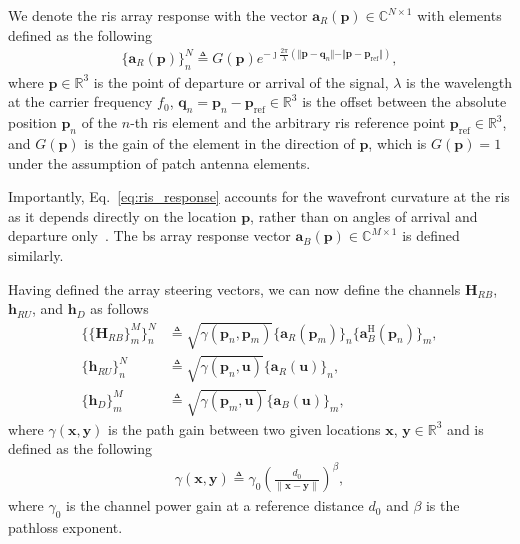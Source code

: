 \documentclass[10pt,journal,compsoc]{IEEEtran}
\newcommand{\ssub}[1]{{\scriptscriptstyle { #1}}}
\newcommand{\mb}[1]{\mathbf{{#1}}}
\newcommand{\herm}{\mathrm{H}}
\begin{document}
We denote the \gls{ris} array response with the vector $\mb{a}_{\ssub{R}}(\mb{p}) \in \mathbb{C}^{N \times 1}$ with elements defined as the following
\begin{align}
    \{\mb{a}_{\ssub{R}}(\mb{p})\}^N_n \triangleq G(\mb{p}) e^{ -\jmath \frac{2 \pi }{\lambda} \left(\Vert \mb{p}-\mb{q}_n\Vert-\Vert \mb{p}-\mb{p}_{\text{ref}}\Vert \right)}, \label{eq:ris_response}
\end{align}
where $\mb{p} \in \mathbb{R}^3$ is the point of departure or arrival of the signal, $\lambda$ is the wavelength at the carrier frequency $f_0$, $\mb{q}_n=\mb{p}_n-\mb{p}_{\text{ref}}  \in \mathbb{R}^3$ is the offset between the absolute position $\mb{p}_n$ of the $n$-th \gls{ris} element and the arbitrary \gls{ris} reference point $\mb{p}_{\text{ref}} \in \mathbb{R}^3$, and $G(\mb{p})$ is the gain of the element 
in the direction of $\mb{p}$, which is 
$G(\mb{p}) = 1$ under the assumption of patch antenna elements. 

Importantly, Eq.~\eqref{eq:ris_response} accounts for the wavefront curvature at the \gls{ris} as it depends directly on the location $\mb{p}$, rather than on angles of arrival and departure only~\cite{abu2021near, rahal2021ris}. The \gls{bs} array response vector $\mb{a}_{\ssub{B}}(\bm{p}) \in \mathbb{C}^{M \times 1}$ is defined similarly.

Having defined the array steering vectors, we can now define the channels $\mb{H}_{\ssub{RB}}$, $\mb{h}_{\ssub{RU}}$, and $\mb{h}_{\ssub{D}}$ as follows
\begin{align}
    \{\{\mb{H}_{\ssub{RB}}\}^{M}_{m}\}^N_n &\triangleq \sqrt{\gamma(\mb{p}_n,\mb{p}_m)}\{\mb{a}_{\ssub{R}}(\mb{p}_m)\}_n\{\mb{a}^{\herm}_{\ssub{B}}(\mb{p}_n)\}_m, \label{eq:channel_bs_ris}\\
    \{\mb{h}_{\ssub{RU}}\}^N_n & \triangleq \sqrt{\gamma(\mb{p}_n,\mb{u})}\{\mb{a}_{\ssub{R}}(\mb{u})\}_n, \label{eq:channel_ris_ue}\\
    \{\mb{h}_{\ssub{D}}\}^M_m & \triangleq \sqrt{\gamma(\mb{p}_m,\mb{u})}\{\mb{a}_{\ssub{B}}(\mb{u})\}_m, \label{eq:channel_bs_ue}  
\end{align}
where $\gamma(\mb{x},\mb{y})$ is the path gain between two given locations $\mb{x}$, $\mb{y} \in \mathbb{R}^3$ and is defined as the following
\begin{align}
\gamma(\mb{x},\mb{y}) \triangleq \gamma_0 \left( \tfrac{d_0}{\|\mb{x} - \mb{y}\|} \right)^\beta,
\label{eq:path_gain}
\end{align}
where $\gamma_0$ is the channel power gain at a reference distance $d_0$ and $\beta$ is the pathloss exponent.
\end{document}
